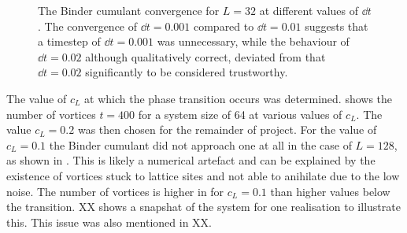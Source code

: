 \begin{figure}[htbp!]
\centering
\caption{The Binder cumulant convergence for $L=32$ at different values of $\dd{t}$. The convergence of $\dd{t}=0.001$ compared to $\dd{t}=0.01$ suggests that a timestep of $\dd{t}=0.001$ was unnecessary, while the behaviour of $\dd{t}=0.02$ although qualitatively correct, deviated from that $\dd{t}=0.02$ significantly to be considered trustworthy.}
\label{fig:binder_different_cL}
\end{figure}

The value of $c_L$ at which the phase transition occurs was determined. \fig{\ref{fig:vor_vs_cL}} shows the number of vortices $t=400$ for a system size of 64 at various values of $c_L$. The value $c_L = 0.2$ was then chosen for the remainder of project. For the value of $c_L=0.1$ the Binder cumulant did not approach one at all in the case of $L=128$, as shown in \fig{\ref{fig:binder_cL_0.1}}. This is likely a numerical artefact and can be explained by the existence of vortices stuck to lattice sites and not able to anihilate due to the low noise. The number of vortices is higher in \fig{\ref{fig:vor_vs_cL}} for $c_L=0.1$ than higher values below the transition. XX shows a snapshat of the system for one realisation to illustrate this. This issue was also mentioned in XX.     

